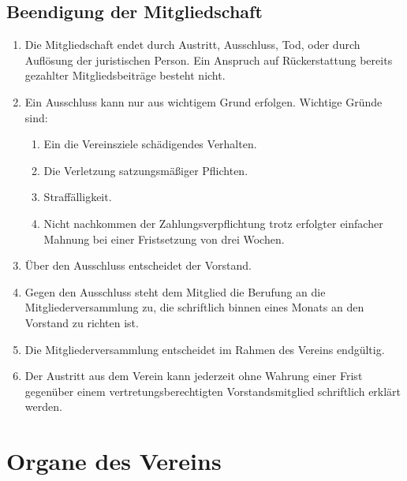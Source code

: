 \documentclass[12pt,a4paper,draft]{article}
\begin{document}
\subsection{Beendigung der Mitgliedschaft} %
\begin{enumerate}
\item Die Mitgliedschaft endet durch Austritt, Ausschluss, Tod, oder durch 
Auflösung der juristischen Person. Ein Anspruch auf Rückerstattung bereits 
gezahlter Mitgliedsbeiträge besteht nicht.

\item Ein Ausschluss kann nur aus wichtigem Grund erfolgen. 
Wichtige Gründe sind:

\begin{enumerate}
\item Ein die Vereinsziele schädigendes Verhalten.

\item Die Verletzung satzungsmäßiger Pflichten.

\item Straffälligkeit.
 
\item Nicht nachkommen der Zahlungsverpflichtung trotz erfolgter 
einfacher Mahnung bei einer Fristsetzung von drei Wochen.
\end{enumerate}

\item Über den Ausschluss entscheidet der Vorstand.

\item Gegen den Ausschluss steht dem Mitglied die Berufung an die 
Mitgliederversammlung zu, die schriftlich binnen eines Monats an den Vorstand 
zu richten ist.

\item Die Mitgliederversammlung entscheidet im Rahmen des Vereins endgültig.

\item Der Austritt aus dem Verein kann jederzeit ohne Wahrung einer Frist 
gegenüber einem vertretungsberechtigten Vorstandsmitglied schriftlich erklärt 
werden. %
\end{enumerate}

\section{Organe des Vereins}
\end{document}
